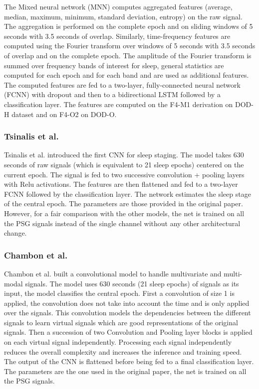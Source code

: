 \documentclass[journal]{IEEEtran}
\begin{document}
The Mixed neural network (MNN) computes aggregated features (average, median, maximum, minimum, standard deviation, entropy) on the raw signal. The aggregation is performed on the complete epoch and on sliding windows of 5 seconds with 3.5 seconds of overlap. Similarly, time-frequency features are computed using the Fourier transform over windows of 5 seconds with 3.5 seconds of overlap and on the complete epoch. The amplitude of the Fourier transform is summed over frequency bands of interest for sleep, general statistics are computed for each epoch and for each band and are used as additional features. The computed features are fed to a two-layer, fully-connected neural network (FCNN) with dropout and then to a bidirectional LSTM followed by a classification layer. The features are computed on the F4-M1 derivation on DOD-H dataset and on F4-O2 on DOD-O.

\subsubsection{Tsinalis et al. \cite{Tsinalis2016a}}
Tsinalis et al. \cite{Tsinalis2016a} introduced the first CNN for sleep staging. The model takes 630 seconds of raw signals (which is equivalent to 21 sleep epochs) centered on the current epoch. The signal is fed to two successive convolution + pooling layers with Relu activations. The features are then flattened and fed to a two-layer FCNN followed by the classification layer. The network estimates the sleep stage of the central epoch. The parameters are those provided in the original paper. However, for a fair comparison with the other models, the net is trained on all the PSG signals instead of the single channel without any other architectural change.

\subsubsection{Chambon et al. \cite{Chambon2018}}
Chambon et al. \cite{Chambon2018} built a convolutional model to handle multivariate and multi-modal signals. The model uses 630 seconds (21 sleep epochs) of signals as its input, the model classifies the central epoch. First a convolution of size 1 is applied, the convolution does not take into account the time and is only applied over the signals. This convolution models the dependencies between the different signals to learn virtual signals which are good representations of the original signals. Then a succession of two Convolution and Pooling layer blocks is applied on each virtual signal independently. Processing each signal independently reduces the overall complexity and increases the inference and training speed. The output of the CNN is flattened before being fed to a final classification layer. The parameters are the one used in the original paper, the net is trained on all the PSG signals. 
\end{document}
